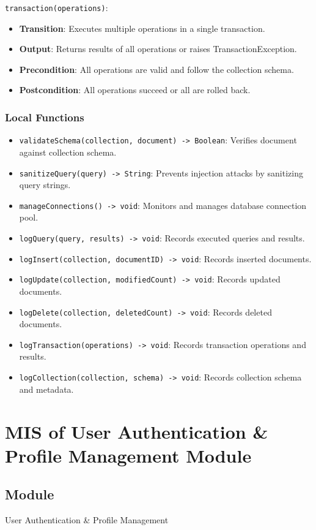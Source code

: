 \documentclass[12pt, titlepage]{article}
\begin{document}
\noindent \texttt{transaction(operations)}:
\begin{itemize}
    \item \textbf{Transition}: Executes multiple operations in a single transaction.
    \item \textbf{Output}: Returns results of all operations or raises TransactionException.
    \item \textbf{Precondition}: All operations are valid and follow the collection schema.
    \item \textbf{Postcondition}: All operations succeed or all are rolled back.
\end{itemize}

\subsubsection{Local Functions}
\begin{itemize}
    \item \texttt{validateSchema(collection, document) -> Boolean}: Verifies document against collection schema.
    \item \texttt{sanitizeQuery(query) -> String}: Prevents injection attacks by sanitizing query strings.
    \item \texttt{manageConnections() -> void}: Monitors and manages database connection pool.
    \item \texttt{logQuery(query, results) -> void}: Records executed queries and results.
    \item \texttt{logInsert(collection, documentID) -> void}: Records inserted documents.
    \item \texttt{logUpdate(collection, modifiedCount) -> void}: Records updated documents.
    \item \texttt{logDelete(collection, deletedCount) -> void}: Records deleted documents.
    \item \texttt{logTransaction(operations) -> void}: Records transaction operations and results.
    \item \texttt{logCollection(collection, schema) -> void}: Records collection schema and metadata.
\end{itemize}

\section{MIS of User Authentication & Profile Management Module}

\subsection{Module}
User Authentication & Profile Management
\end{document}
